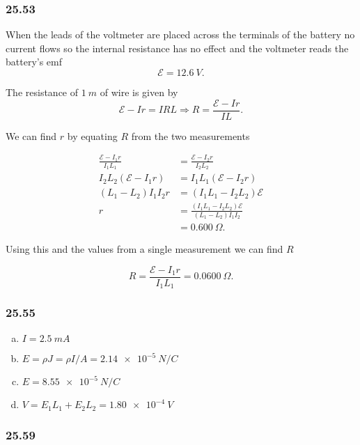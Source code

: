 \documentclass{article}
\begin{document}
\subsubsection{25.53}

When the leads of the voltmeter are placed across the terminals of the battery no current flows so the internal resistance has no effect and the voltmeter reads the battery's emf \[\mathcal{E} = \qty{12.6}{V}.\]

The resistance of $\qty{1}{m}$ of wire is given by \[\mathcal{E} - I r = I R L \Rightarrow R = \frac{\mathcal{E} - I r}{I L}.\]

We can find $r$ by equating $R$ from the two measurements

\begin{align*}
  \frac{\mathcal{E} - I_1 r}{I_1 L_1} & = \frac{\mathcal{E} - I_2 r}{I_2 L_2}                         \\
  I_2 L_2 (\mathcal{E} - I_1 r)       & = I_1 L_1 (\mathcal{E} - I_2 r)                               \\
  (L_1 - L_2) I_1 I_2 r               & = (I_1 L_1 - I_2 L_2) \mathcal{E}                             \\
  r                                   & = \frac{(I_1 L_1 - I_2 L_2) \mathcal{E}}{(L_1 - L_2) I_1 I_2} \\
                                      & = \qty{0.600}{\Omega}.
\end{align*}

Using this and the values from a single measurement we can find $R$

\[R = \frac{\mathcal{E} - I_1 r}{I_1 L_1} = \qty{0.0600}{\Omega}.\]

\subsubsection{25.55}

\begin{enumerate}[(a)]
  \item $I = \qty{2.5}{mA}$

  \item $E = \rho J = \rho I / A = \qty{2.14e-5}{N/C}$

  \item $E = \qty{8.55e-5}{N/C}$

  \item $V = E_1 L_1 + E_2 L_2 = \qty{1.80e-4}{V}$
\end{enumerate}

\subsubsection{25.59}
\end{document}
